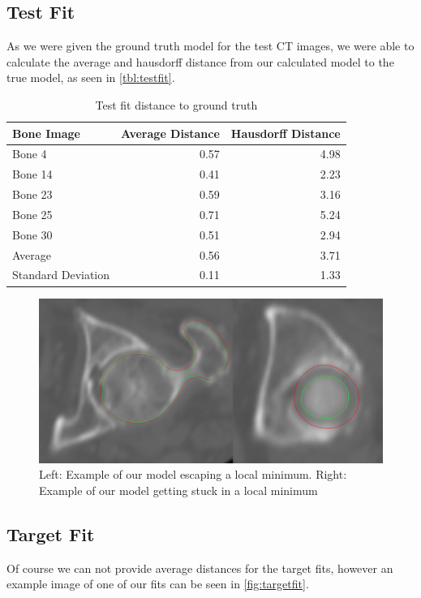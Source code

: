 \subsection{Test Fit}
\label{subsec:testfit}
As we were given the ground truth model for the test CT images, we were able to calculate the average and hausdorff distance from our calculated model to the true model, as seen in \autoref{tbl:testfit}. 

\begin{table}
  \centering
  \caption{Test fit distance to ground truth}
  \label{tbl:testfit}
  \begin{tabular}{lrr}
    \toprule
      \textbf{Bone Image} &
      Average Distance &
       Hausdorff Distance \\
    \midrule
      Bone 4 & 0.57 & 4.98 \\
      Bone 14 & 0.41 & 2.23 \\
      Bone 23 & 0.59 & 3.16 \\
      Bone 25 & 0.71 & 5.24 \\
      Bone 30 & 0.51 & 2.94 \\
    \midrule
      Average & 0.56 & 3.71 \\
      Standard Deviation & 0.11 & 1.33 \\
    \bottomrule
  \end{tabular}
\end{table}

\begin{figure}
	\centering
  \includegraphics[width=\columnwidth]{./Figures/local_minimum_comparison}
  \caption{
    Left: Example of our model escaping a local minimum. Right: Example of our model getting stuck in a local minimum}
  \label{fig:testfit}
\end{figure}

\subsection{Target Fit}
Of course we can not provide average distances for the target fits, however an example image of one of our fits can be seen in \autoref{fig:targetfit}.

